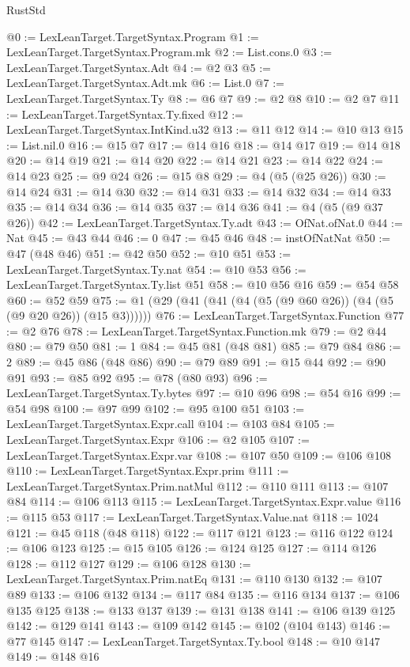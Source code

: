 \begin{lexlean}{RustStd}
\begin{coremodule}
@0 := LexLeanTarget.TargetSyntax.Program
@1 := LexLeanTarget.TargetSyntax.Program.mk
@2 := List.cons.{0}
@3 := LexLeanTarget.TargetSyntax.Adt
@4 := @2 @3
@5 := LexLeanTarget.TargetSyntax.Adt.mk
@6 := List.{0}
@7 := LexLeanTarget.TargetSyntax.Ty
@8 := @6 @7
@9 := @2 @8
@10 := @2 @7
@11 := LexLeanTarget.TargetSyntax.Ty.fixed
@12 := LexLeanTarget.TargetSyntax.IntKind.u32
@13 := @11 @12
@14 := @10 @13
@15 := List.nil.{0}
@16 := @15 @7
@17 := @14 @16
@18 := @14 @17
@19 := @14 @18
@20 := @14 @19
@21 := @14 @20
@22 := @14 @21
@23 := @14 @22
@24 := @14 @23
@25 := @9 @24
@26 := @15 @8
@29 := @4 (@5 (@25 @26))
@30 := @14 @24
@31 := @14 @30
@32 := @14 @31
@33 := @14 @32
@34 := @14 @33
@35 := @14 @34
@36 := @14 @35
@37 := @14 @36
@41 := @4 (@5 (@9 @37 @26))
@42 := LexLeanTarget.TargetSyntax.Ty.adt
@43 := OfNat.ofNat.{0}
@44 := Nat
@45 := @43 @44
@46 := 0
@47 := @45 @46
@48 := instOfNatNat
@50 := @47 (@48 @46)
@51 := @42 @50
@52 := @10 @51
@53 := LexLeanTarget.TargetSyntax.Ty.nat
@54 := @10 @53
@56 := LexLeanTarget.TargetSyntax.Ty.list @51
@58 := @10 @56 @16
@59 := @54 @58
@60 := @52 @59
@75 := @1 (@29 (@41 (@41 (@4 (@5 (@9 @60 @26)) (@4 (@5 (@9 @20 @26)) (@15 @3))))))
@76 := LexLeanTarget.TargetSyntax.Function
@77 := @2 @76
@78 := LexLeanTarget.TargetSyntax.Function.mk
@79 := @2 @44
@80 := @79 @50
@81 := 1
@84 := @45 @81 (@48 @81)
@85 := @79 @84
@86 := 2
@89 := @45 @86 (@48 @86)
@90 := @79 @89
@91 := @15 @44
@92 := @90 @91
@93 := @85 @92
@95 := @78 (@80 @93)
@96 := LexLeanTarget.TargetSyntax.Ty.bytes
@97 := @10 @96
@98 := @54 @16
@99 := @54 @98
@100 := @97 @99
@102 := @95 @100 @51
@103 := LexLeanTarget.TargetSyntax.Expr.call
@104 := @103 @84
@105 := LexLeanTarget.TargetSyntax.Expr
@106 := @2 @105
@107 := LexLeanTarget.TargetSyntax.Expr.var
@108 := @107 @50
@109 := @106 @108
@110 := LexLeanTarget.TargetSyntax.Expr.prim
@111 := LexLeanTarget.TargetSyntax.Prim.natMul
@112 := @110 @111
@113 := @107 @84
@114 := @106 @113
@115 := LexLeanTarget.TargetSyntax.Expr.value
@116 := @115 @53
@117 := LexLeanTarget.TargetSyntax.Value.nat
@118 := 1024
@121 := @45 @118 (@48 @118)
@122 := @117 @121
@123 := @116 @122
@124 := @106 @123
@125 := @15 @105
@126 := @124 @125
@127 := @114 @126
@128 := @112 @127
@129 := @106 @128
@130 := LexLeanTarget.TargetSyntax.Prim.natEq
@131 := @110 @130
@132 := @107 @89
@133 := @106 @132
@134 := @117 @84
@135 := @116 @134
@137 := @106 @135 @125
@138 := @133 @137
@139 := @131 @138
@141 := @106 @139 @125
@142 := @129 @141
@143 := @109 @142
@145 := @102 (@104 @143)
@146 := @77 @145
@147 := LexLeanTarget.TargetSyntax.Ty.bool
@148 := @10 @147
@149 := @148 @16

\end{coremodule}
\end{lexlean}
